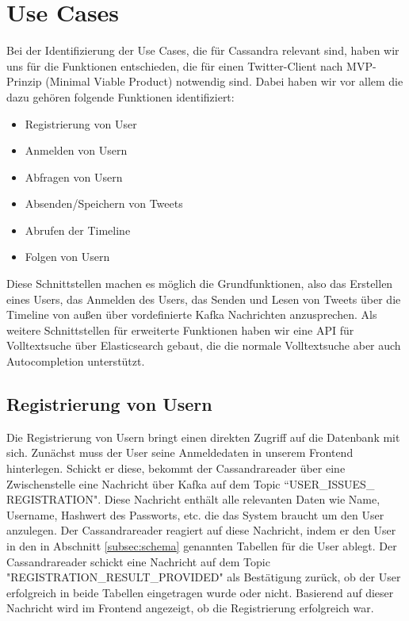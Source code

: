\section{Use Cases}
\label{sec:usecase}
Bei der Identifizierung der Use Cases, die für Cassandra relevant sind, haben wir uns für die Funktionen entschieden, die für einen Twitter-Client nach MVP-Prinzip (Minimal Viable Product) notwendig sind. Dabei haben wir vor allem die dazu gehören folgende Funktionen identifiziert:
\begin{itemize}
	\item Registrierung von User
	\item Anmelden von Usern
	\item Abfragen von Usern
	\item Absenden/Speichern von Tweets
	\item Abrufen der Timeline
	\item Folgen von Usern
\end{itemize}
Diese Schnittstellen machen es möglich die Grundfunktionen, also das Erstellen eines Users, das Anmelden des Users, das Senden und Lesen von Tweets über die Timeline von außen über vordefinierte Kafka Nachrichten anzusprechen.
Als weitere Schnittstellen für erweiterte Funktionen haben wir eine API für Volltextsuche über Elasticsearch gebaut, die die normale Volltextsuche aber auch Autocompletion unterstützt.\\

\subsection{Registrierung von Usern}
Die Registrierung von Usern bringt einen direkten Zugriff auf die Datenbank mit sich. Zunächst muss der User seine Anmeldedaten in unserem Frontend hinterlegen. Schickt er diese, bekommt der Cassandrareader über eine Zwischenstelle eine Nachricht über Kafka auf dem Topic ``USER\_ISSUES\_ REGISTRATION". Diese Nachricht enthält alle relevanten Daten wie Name, Username, Hashwert des Passworts, etc. die das System braucht um den User anzulegen. Der Cassandrareader reagiert auf diese Nachricht, indem er den User in den in Abschnitt \ref{subsec:schema} genannten Tabellen für die User ablegt. Der Cassandrareader schickt eine Nachricht auf dem Topic "REGISTRATION\_RESULT\_PROVIDED" als Bestätigung zurück, ob der User erfolgreich in beide Tabellen eingetragen wurde oder nicht. Basierend auf dieser Nachricht wird im Frontend angezeigt, ob die Registrierung erfolgreich war.

